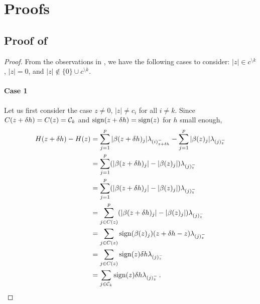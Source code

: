 \section{Proofs}\label{sec:proofs}

\subsection{Proof of }

\begin{proof}\label{app:proof_directional_derivative}
  \label{app:proof_directional_slope}
  From the observations in ,
  we have the following cases to consider: \(|z| \in c^{\setminus k}\),
  \(|z| = 0\), and \(|z| \notin \{0\} \cup c^{\setminus k}\).


  \paragraph{Case 1}
  Let us first consider the case $z \neq 0$, $|z| \neq c_i$ for all $i \neq k$.
  Since \(C(z + \delta h) = C(z) = \mathcal{C}_k\) and $\operatorname{sign}(z + \delta h) = \operatorname{sign}(z)$ for $h$ small enough,
  \begin{align}
    H(z + \delta h) - H(z)
      &= \sum_{j =1}^p |\beta(z + \delta h)_j| \lambda_{(i)^-_{z + \delta h}}
          - \sum_{j=1}^p |\beta(z)_j| \lambda_{(j)^-_z} \nonumber \\
      &= \sum_{j =1}^p (|\beta(z + \delta h)_j| - |\beta(z)_j|) \lambda_{(j)^-_z} \nonumber  \\
      &= \sum_{j =1}^p (|\beta(z + \delta h)_j| - |\beta(z)_j|) \lambda_{(j)^-_z} \nonumber  \\
      &= \sum_{j \in C(z)}^p (|\beta(z + \delta h)_j| - |\beta(z)_j|) \lambda_{(j)^-_z} \nonumber \\
      &= \sum_{j \in C(z)} \operatorname{sign}(\beta(z)_j) (z + \delta h - z) \lambda_{(j)^-_z} \nonumber \\
      &= \sum_{j \in C(z)} \operatorname{sign}(z) \delta h  \lambda_{(j)^-_z} \nonumber \\
      &= \sum_{j \in \mathcal{C}_k} \operatorname{sign}(z) \delta h  \lambda_{(j)^-_z} \, .
  \end{align}


\end{proof}
